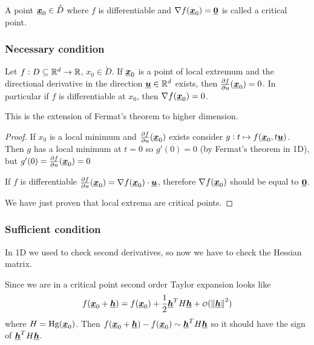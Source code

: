 \documentclass[12pt]{extarticle}
\renewcommand{\vec}[1]{\uvec{#1}}
\newcommand{\Hg}{{\operatorfont Hg}}
\begin{document}
\begin{definition}
    A point $\vec x_0 \in \mathring{D}$ where $f$ is differentiable and $\nabla f(\vec x_0)= \vec 0$ is called a critical point.
\end{definition}

\subsubsection{Necessary condition}

\begin{proposition}
    Let $f: D\subseteq \mathbb{R}^d \to \mathbb{R}$, $x_0 \in \mathring{D}$.
    If $\vec x_0$ is a point of local extremum and the directional derivative in the direction $\vec u \in \R^d$ exists, then $\pdv{f}{u}()(\vec x_0) = 0$.
    In particular if $f$ is differentiable at $x_0$, then $\nabla f(\vec x_0) = 0$.
\end{proposition}

\begin{remark}
    This is the extension of Fermat's theorem to higher dimension.
\end{remark}

\begin{proof}
    If $x_0$ is a local minimum and $\pdv{f}{u}()(\vec x_0)$ exists consider $g: t \mapsto f(\vec x_0, t \vec u)$.
    Then $g$ has a local minimum at $t = 0$ so $g'(0) = 0$ (by Fermat's theorem in 1D),
    but $g'(0) = \pdv{f}{u}()(\vec x_0) = 0$

    If $f$ is differentiable $\pdv{f}{u}()(\vec x_0) = \nabla f (\vec x_0) \cdot \vec u$, therefore $\nabla f(\vec x_0)$ should be equal to $\vec 0$.

    We have just proven that local extrema are critical points.
\end{proof}

\subsubsection{Sufficient condition}

In 1D we used to check second derivatives, so now we have to check the Hessian matrix.

Since we are in a critical point second order Taylor expansion looks like
\begin{equation}
    f(\vec x_0 + \vec h) = f(\vec x_0) + \frac{1}{2} \vec h^T H \vec h + \o(\norm{\vec h}^2)
\end{equation}
where $H = \Hg(\vec x_0)$.
Then $f(\vec x_0 + \vec h) - f(\vec x_0) \sim \vec h^T H \vec h$ so it should have the sign of $\vec h^T H \vec h$.
\end{document}
